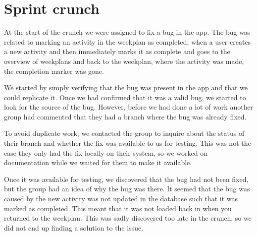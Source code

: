 \section{Sprint crunch}
At the start of the crunch we were assigned to fix a bug in the app.
The bug was related to marking an activity in the weekplan as completed; when a user creates a new activity and then immediately marks it as complete and goes to the overview of weekplans and back to the weekplan, where the activity was made, the completion marker was gone.

We started by simply verifying that the bug was present in the app and that we could replicate it.
Once we had confirmed that it was a valid bug, we started to look for the source of the bug. 
However, before we had done a lot of work another group had commented that they had a branch where the bug was already fixed.

To avoid duplicate work, we contacted the group to inquire about the status of their branch and whether the fix was available to us for testing.
This was not the case they only had the fix locally on their system, so we worked on documentation while we waited for them to make it available.

Once it was available for testing, we discovered that the bug had not been fixed, but the group had an idea of why the bug was there.
It seemed that the bug was caused by the new activity was not updated in the database such that it was marked as completed.
This meant that it was not loaded back in when you returned to the weekplan. 
This was sadly discovered too late in the crunch, so we did not end up finding a solution to the issue.
